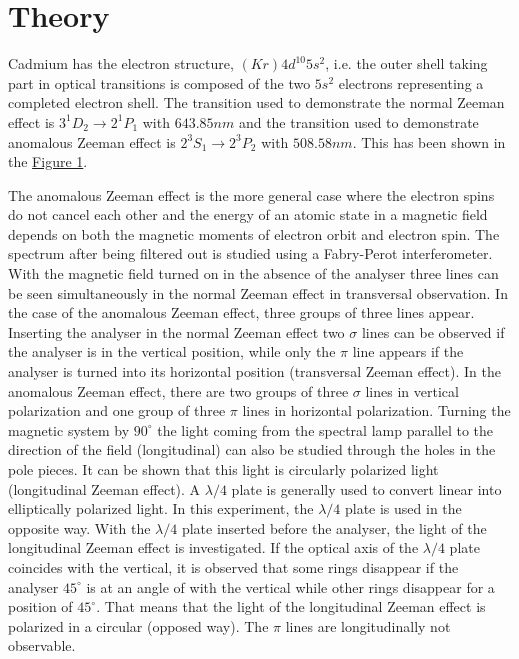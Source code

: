 \section{Theory}

	Cadmium has the electron structure, $(Kr)4d^{10}5s^2$, i.e. the outer shell taking part in optical transitions is composed of the two $5s^2$ electrons representing a completed electron shell. The transition used to demonstrate the normal Zeeman effect is $3^1 D_2 \rightarrow 2^1 P_1$ with $643.85nm$ and the transition used to demonstrate anomalous Zeeman effect is $2^3S_1 \rightarrow 2^3P_2$ with $508.58nm$. This has been shown in the \hyperref[fig:splitting]{Figure 1}.

	The anomalous Zeeman effect is the more general case where the electron spins do not cancel each other and the energy of an atomic state in a magnetic field depends on both the magnetic moments of electron orbit and electron spin. The spectrum after being filtered out is studied using a Fabry-Perot interferometer. With the magnetic field turned on in the absence of the analyser three lines can be seen simultaneously in the normal Zeeman effect in transversal observation. In the case of the anomalous Zeeman effect, three groups of three lines appear. Inserting the analyser in the normal Zeeman effect two $\sigma$ lines can be observed if the analyser is in the vertical position, while only the $\pi$ line appears if the analyser is turned into its horizontal position (transversal Zeeman effect). In the anomalous Zeeman effect, there are two groups of three $\sigma$ lines in vertical polarization and one group of three $\pi$ lines in horizontal polarization. Turning the magnetic system by $90^\circ$ the light coming from the spectral lamp parallel to the direction of the field (longitudinal) can also be studied through the holes in the pole pieces. It can be shown that this light is circularly polarized light (longitudinal Zeeman effect). A $\lambda/4$ plate is generally used to convert linear into elliptically polarized light. In this experiment, the $\lambda/4$ plate is used in the opposite way. With the $\lambda/4$ plate inserted before the analyser, the light of the longitudinal Zeeman effect is investigated. If the optical axis of the $\lambda/4$ plate coincides with the vertical, it is observed that some rings disappear if the analyser $45^\circ$ is at an angle of with the vertical while other rings disappear for a position of $45^\circ$. That means that the light of the longitudinal Zeeman effect is polarized in a circular (opposed way). The $\pi$ lines are longitudinally not observable.

